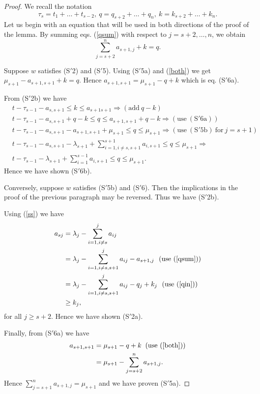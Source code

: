 \documentclass[ALCO,Unicode]{cedram}
\newcommand{\m}{\mu}
\numberwithin{equation}{section}
\begin{document}
	\begin{proof} We recall the notation \[\tau_s=t_1 + \dots + t_{s-2},  \  q=q_{s+2}+\dots+q_n,                     \ k  = k_{s+2} + \dots + k_n.\]Let us begin with an equation that will be used in both directions of the proof of the lemma. By summing eqs. (\ref{qsum}) with respect to $j=s+2, \dots, n$, we obtain \begin{equation}\label{both}\sum_{j=s+2}^na_{s+1,j}+k=q.\end{equation}

Suppose $w$ satisfies (S$'$2) and (S$'$5).  Using (S$'$5a) and (\ref{both}) we get $\mu_{s+1}-a_{s+1,s+1}+k=q$. Hence  $a_{s+1,s+1}=\mu_{s+1}-q+k$ which is eq. (S$'$6a).

From (S$'$2b) we have \begin{align*}&t-\tau_{s-1}-a_{s,s+1} \le k \le a_{s+1s+1} \Rightarrow (\mathrm{add} \  q-k) \\ &
	t-\tau_{s-1}-a_{s,s+1}+q-k \le q \le a_{s+1,s+1}	+q-k \Rightarrow (\mathrm{use \  (S'6a)}) \\&
	t-\tau_{s-1}-a_{s,s+1}-a_{s+1,s+1}+\m_{s+1} \le q \le \mu_{s+1} \Rightarrow (\mathrm{use \  (S'5b) \  for} \  j=s+1) \\&
	t-\tau_{s-1}-a_{s,s+1}-\lambda_{s+1}+\sum_{i=1, i \neq s,s+1}^{s+1}a_{i,s+1} \le q \le \mu_{s+1} \Rightarrow \\&
	t-\tau_{s-1}-\lambda_{s+1}+\sum_{i=1}^{s-1}a_{i,s+1} \le q \le \mu_{s+1}.
\end{align*}
Hence we have shown (S$'$6b).

Conversely, suppose $w$ satisfies (S$'$5b) and (S$'$6). Then the implications in the proof of the previous paragraph may be reversed. Thus we have  (S$'$2b). 

Using (\ref{ss}) we have \begin{align*}
a_{sj}&=\lambda_j- \sum_{i=1, i \neq s}^{j}a_{ij} \\&=
\lambda_j- \sum_{i=1, i \neq s, s+1}^{j}a_{ij}-a_{s+1,j} \  \   (\mathrm{use \  (\ref{qsum})}) \\&=\lambda_j- \sum_{i=1, i \neq s, s+1}^{j}a_{ij}-q_{j} +k_j \  \   (\mathrm{use \  (\ref{qin})})\\&
\ge k_j,
\end{align*}
for  all $j \ge s+2$. Hence we have shown (S$'$2a).

Finally, from (S$'$6a) we have \begin{align*}a_{s+1,s+1}&=\mu_{s+1}-q+k \; \;  (\mathrm{use \  (\ref{both})})\\&
	=\mu_{s+1} -\sum_{j=s+2}^n a_{s+1,j}.	\end{align*}
Hence $\sum_{j=s+1}^{n} a_{s+1,j}=\mu_{s+1}$ and we have proven (S$'$5a). \end{proof}
		
\end{document}
